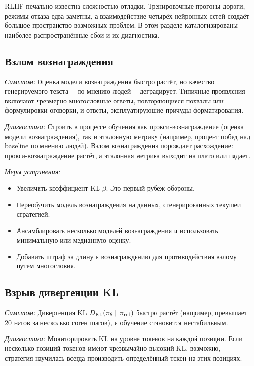 RLHF печально известна сложностью отладки. Тренировочные прогоны дороги, режимы отказа едва заметны, а взаимодействие четырёх нейронных сетей создаёт большое пространство возможных проблем. В этом разделе каталогизированы наиболее распространённые сбои и их диагностика.

\subsection{Взлом вознаграждения}

\emph{Симптом:} Оценка модели вознаграждения быстро растёт, но качество генерируемого текста\,---\,по мнению людей\,---\,деградирует. Типичные проявления включают чрезмерно многословные ответы, повторяющиеся похвалы или формулировки-оговорки, и ответы, эксплуатирующие причуды форматирования.

\emph{Диагностика:} Строить в процессе обучения как прокси-вознаграждение (оценка модели вознаграждения), так и эталонную метрику (например, процент побед над baseline по мнению людей). Взлом вознаграждения порождает расхождение: прокси-вознаграждение растёт, а эталонная метрика выходит на плато или падает.

\emph{Меры устранения:}
\begin{itemize}[leftmargin=*]
  \item Увеличить коэффициент KL $\beta$. Это первый рубеж обороны.
  \item Переобучить модель вознаграждения на данных, сгенерированных текущей стратегией.
  \item Ансамблировать несколько моделей вознаграждения и использовать минимальную или медианную оценку.
  \item Добавить штраф за длину к вознаграждению для противодействия взлому путём многословия.
\end{itemize}

\subsection{Взрыв дивергенции KL}

\emph{Симптом:} Дивергенция KL $D_{\mathrm{KL}}\!\left(\pi_\theta\;\|\;\pi_{\mathrm{ref}}\right)$ быстро растёт (например, превышает 20 натов за несколько сотен шагов), и обучение становится нестабильным.

\emph{Диагностика:} Мониторировать KL на уровне токенов на каждой позиции. Если несколько позиций токенов имеют чрезвычайно высокий KL, возможно, стратегия научилась всегда производить определённый токен на этих позициях.

